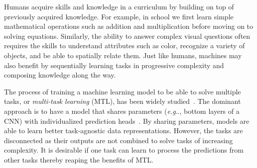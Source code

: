 \documentclass{article}
\makeatletter
\DeclareRobustCommand\onedot{\futurelet\@let@token\@onedot}
\def\@onedot{\ifx\@let@token.\else.\null\fi\xspace}
\def\eg{\emph{e.g}\onedot} \def\Eg{\emph{E.g}\onedot}
\makeatother
\begin{document}


Humans acquire skills and knowledge in a curriculum by building on top of previously acquired knowledge.
For example, in school we first learn simple mathematical operations such as addition and multiplication before moving on to solving equations.
Similarly, the ability to %
answer complex visual questions often requires the skills to understand attributes such as color, recognize a variety of objects, and be able to spatially relate them.
Just like humans, machines may also benefit by sequentially learning tasks in progressive complexity and composing knowledge along the way.


The process of training a machine learning model to be able to solve multiple tasks, or \textit{multi-task learning} (MTL), has been widely studied~\citep{long17mtl_reln,ruder17overview_mtl,ruder17sluice,rusu16}.
The dominant approach is to have a model that shares parameters (\eg, bottom layers of a CNN) with individualized prediction heads~\citep{caruana1993,long17mtl_reln}.
By sharing parameters, models are able to learn better task-agnostic data representations.
However, the tasks are disconnected as their outputs are not combined to solve tasks of increasing complexity.
It is desirable if one task can learn to process the predictions from other tasks thereby reaping the benefits of MTL.
\end{document}
